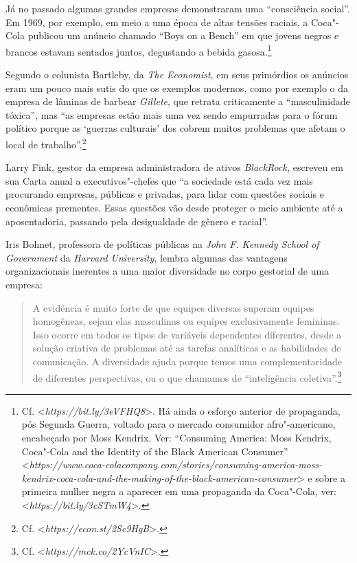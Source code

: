 Já no passado algumas grandes empresas demonstraram uma ``consciência
social''. Em 1969, por exemplo, em meio a uma época de altas tensões
raciais, a Coca"-Cola publicou um anúncio chamado ``Boys on a Bench'' em
que jovens negros e brancos estavam sentados juntos, degustando a bebida
gasosa.\footnote{Cf.
  \textless{}\emph{https://bit.ly/3eVFHQ8}\textgreater{}.
  Há ainda o esforço anterior de propaganda, pós Segunda Guerra, voltado
  para o mercado consumidor afro"-americano, encabeçado por Moss Kendrix.
  Ver: ``Consuming America: Moss Kendrix, Coca"-Cola and the Identity of
  the Black American Consumer''
  \textless{}\emph{https://www.coca-colacompany.com/stories/consuming-america-moss-kendrix-coca-cola-and-the-making-of-the-black-american-consumer}\textgreater{}
  e sobre a primeira mulher negra a aparecer em uma propaganda da
  Coca"-Cola, ver:
  \textless{}\emph{https://bit.ly/3cSTmW4}\textgreater{}.}

Segundo o colunista Bartleby, da \emph{The Economist}, em seus
primórdios os anúncios eram um pouco mais sutis do que os exemplos
modernos, como por exemplo o da empresa de lâminas de barbear
\emph{Gillete}, que retrata criticamente a ``masculinidade tóxica'', mas
``as empresas estão mais uma vez sendo empurradas para o fórum político
porque as `guerras culturais' dos  cobrem muitos problemas que afetam
o local de trabalho''.\footnote{Cf. \textless{}\emph{https://econ.st/2Sc9HgB}\textgreater{}.}

Larry Fink, gestor da empresa administradora de ativos \emph{BlackRock,}
escreveu em sua Carta anual a executivos"-chefes que ``a sociedade está
cada vez mais procurando empresas, públicas e privadas, para lidar com
questões sociais e econômicas prementes. Essas questões vão desde
proteger o meio ambiente até a aposentadoria, passando pela desigualdade
de gênero e racial''.

Iris Bohnet, professora de políticas públicas na \emph{John F. Kennedy
School of Government} da \emph{Harvard University}, lembra algumas das
vantagens organizacionais inerentes a uma maior diversidade no corpo
gestorial de uma empresa:

\begin{quote}
A evidência é muito forte de que equipes diversas superam equipes
homogêneas, sejam elas masculinas ou equipes exclusivamente femininas.
Isso ocorre em todos os tipos de variáveis dependentes diferentes, desde
a solução criativa de problemas até as tarefas analíticas e as
habilidades de comunicação. A diversidade ajuda porque temos uma
complementaridade de diferentes perspectivas, ou o que chamamos de
``inteligência coletiva''.\footnote{Cf. \textless{}\emph{https://mck.co/2YcVnIC}\textgreater{}.}
\end{quote}

